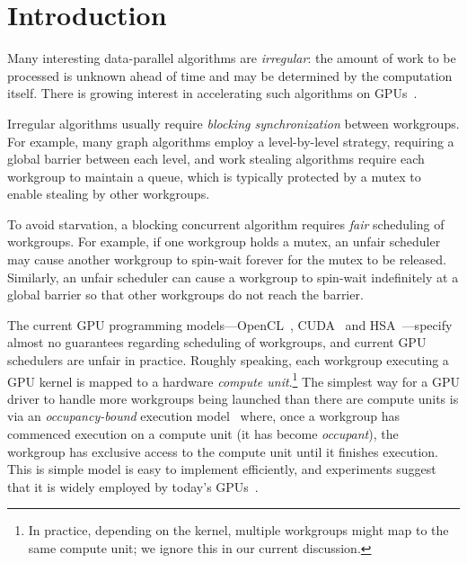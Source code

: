 \documentclass[parskip=half,sigconf,review, anonymous=true, acmcopyrightmode=none]{acmart}
\begin{document}
\section{Introduction}\label{sec:intro}

Many interesting data-parallel algorithms are \emph{irregular}: the amount
of work to be processed is unknown ahead of time and may be determined
by the computation itself.  There is growing interest in accelerating
such algorithms on GPUs~\cite{owens-persistent,DBLP:conf/ipps/KaleemVPHP16,DBLP:conf/ipps/DavidsonBGO14,DBLP:conf/hipc/HarishN07,DBLP:journals/topc/MerrillGG15,DBLP:conf/egh/VineetHPN09,DBLP:conf/ppopp/NobariCKB12,DBLP:conf/hpcc/SolomonTT10a,DBLP:conf/popl/PrabhuRMH11,DBLP:conf/ppopp/Mendez-LojoBP12,DBLP:conf/oopsla/PaiP16,DBLP:conf/oopsla/SorensenDBGR16,DBLP:conf/egh/CedermanT08,TPO10,BNP12,Pannotia}.

Irregular algorithms usually require \emph{blocking synchronization}
between workgroups.  For example, many graph algorithms employ a level-by-level
strategy, requiring a global barrier between each level, and work
stealing algorithms require each workgroup to maintain a queue, which
is typically protected by a mutex to enable stealing by other
workgroups.

To avoid starvation, a blocking concurrent algorithm requires
\emph{fair} scheduling of workgroups.  For
example, if one workgroup holds a mutex, an unfair scheduler may cause
another workgroup to spin-wait forever for the mutex to be
released.  Similarly, an unfair scheduler can cause a workgroup to spin-wait
indefinitely at a global barrier so that other workgroups do not reach the barrier.

 The current GPU programming
models---OpenCL~\cite{opencl2Spec}, CUDA~\cite{cuda-75} and
HSA~\cite{HSAprogramming11}---specify almost no guarantees regarding
scheduling of workgroups, and current GPU schedulers are unfair in
practice.  Roughly speaking, each workgroup executing a GPU kernel is
mapped to a hardware \emph{compute unit}.\footnote{In practice,
  depending on the kernel, multiple workgroups might map to the same
  compute unit; we ignore this in our current discussion.}
%
The simplest way for a GPU driver to handle more workgroups being
launched than there are compute units is via an \emph{occupancy-bound}
execution
model~\cite{owens-persistent,DBLP:conf/oopsla/SorensenDBGR16} where,
once a workgroup has commenced execution on a compute unit (it has
become \emph{occupant}), the workgroup has exclusive access to the
compute unit until it finishes execution.  
This is simple model is easy to implement
efficiently, and experiments suggest that
it is widely employed by today's
GPUs~\cite{owens-persistent,DBLP:conf/oopsla/SorensenDBGR16,DBLP:conf/oopsla/PaiP16,BNP12}.
\end{document}
